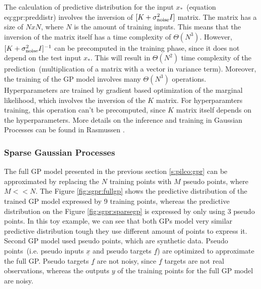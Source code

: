 \noindent The calculation of predictive distribution for the input $x_{*}$\ (equation {eq:gpr:preddistr}) involves the inversion of $[K+\sigma_{\rm noise}^2I]$ matrix. The matrix has a size of $NxN$, where $N$ is the amount of training inputs. This means that the inversion of the matrix itself has a time complexity of $\Theta(N^3)$. However, $[K+\sigma_{\rm noise}^2I]^{-1}$ can be precomputed in the training phase, since it does not depend on the test input $x_{*}$. This will result in $\Theta(N^2)$ time complexity of the prediction\ (multiplication of a matrix with a vector in variance term). Moreover, the training of the GP model involves many $\Theta(N^3)$ operations. Hyperparameters are trained by gradient based optimization of the marginal likelihood, which involves the inversion of the $K$ matrix. For hyperparamters training, this operation can't be precomputed, since $K$ matrix itself depends on the hyperparameters. More details on the inference and training in Gaussian Processes can be found in Rasmussen \cite{rasmussen2006gaussian}.

\subsubsection{Sparse Gaussian Processes}
\label{s:pilco:sgpr}

The full GP model presented in the previous section \ref{s:pilco:gpr} can be approximated by replacing the $N$ training points with $M$ pseudo points, where $M<<N$. The Figure \ref{fig:sgpr:fullgp} shows the predictive distribution of the trained GP model expressed by 9 training points, whereas the predictive distribution on the Figure \ref{fig:sgpr:sparsegp} is expressed by only using 3 pseudo points. In this toy example, we can see that both GPs model very similar predictive distribution tough they use different amount of points to express it. Second GP model used pseudo points, which are synthetic data. Pseudo points\ (i.e. pseudo inputs $\underline{x}$ and pseudo targets $\underline{f}$) are optimized to approximate the full GP. Pseudo targets $\underline{f}$ are not noisy, since $\underline{f}$ targets are not real observations, whereas the outputs $y$ of the training points for the full GP model are noisy. 

